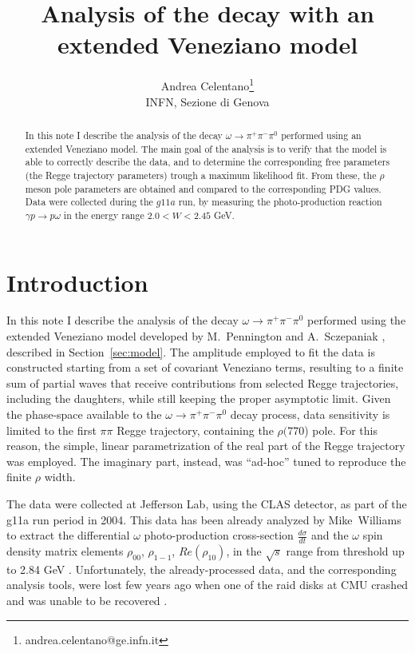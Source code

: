 \documentclass[a4paper,10pt]{report}
\author{Andrea Celentano\thanks{andrea.celentano@ge.infn.it}\\ \small{INFN, Sezione di Genova}}
\title{Analysis of the decay \decay with an extended Veneziano model}
\newcommand{\decay}{$\omega \rightarrow \pi^+ \pi^- \pi^0$ }
\newcommand{\production}{$\gamma p \rightarrow p \omega$ }
\begin{document}
\maketitle
\begin{abstract}
In this note I describe the analysis of the decay \decay performed using an extended Veneziano model.
The main goal of the analysis is to verify that the model is able to correctly describe the data, and to determine the corresponding free parameters (the Regge trajectory parameters) trough a maximum likelihood fit.
From these, the $\rho$ meson pole parameters are obtained and compared to the corresponding PDG values.
Data were collected during the $g11a$ run, by measuring the photo-production reaction \production in the energy range $2.0< W < 2.45$ GeV. 

\end{abstract}
\tableofcontents
\chapter{Introduction}
In this note I describe the analysis of the decay \decay performed using the extended Veneziano model developed by M.~Pennington and A.~Sczepaniak \cite{Szczepaniak:2014qca},
described in Section~\ref{sec:model}.
The amplitude employed to fit the data is constructed starting from a set of covariant Veneziano terms, resulting to a finite sum of partial waves that receive contributions from selected Regge trajectories, including the daughters, while still keeping the
proper asymptotic limit. Given the phase-space available to the \decay decay process, data sensitivity is limited to the first $\pi \pi$ Regge trajectory, containing the $\rho(770$) pole. For this reason, the simple, linear parametrization of the real part of the Regge trajectory was employed. The imaginary
part, instead, was ``ad-hoc'' tuned to reproduce the finite $\rho$ width.

The data were collected at Jefferson Lab, using the CLAS detector, as part of the g11a run period in 2004. 
This data has been already analyzed by Mike~Williams to extract the differential $\omega$ photo-production cross-section $\frac{d\sigma}{dt}$
and the $\omega$ spin density matrix elements $\rho_{00}$, $\rho_{1-1}$, $Re(\rho_{10})$, in the $\sqrt{s}$ range  from threshold up to 2.84 GeV \cite{Williams:2009ab}. 
Unfortunately, the already-processed data, and the corresponding analysis tools, were lost few years ago when one of the raid disks at CMU crashed and was unable to be recovered \cite{BrianCommunication}.
\end{document}
